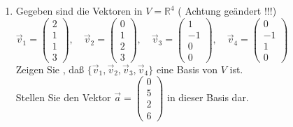 \documentclass[a4paper]{article}
\begin{document}
\begin{enumerate}
\begin{enumerate}
\end{enumerate}
\item Gegeben sind die Vektoren in $V = \mathbb R^4$ ( Achtung geändert !!!)\\
$\vec{v}_1 = \begin{pmatrix} 2 \\ 1 \\ 1 \\ 3 \end{pmatrix}, \quad
\vec{v}_2 = \begin{pmatrix} 0 \\ 1 \\ 2 \\ 3 \end{pmatrix}, \quad
\vec{v}_3 = \begin{pmatrix} 1 \\ -1 \\ 0 \\ 0 \end{pmatrix}, \quad
\vec{v}_4 = \begin{pmatrix} 0 \\ -1 \\ 1 \\ 0 \end{pmatrix} $ \\
Zeigen Sie , daß $\{ \vec{v}_1, \vec{v}_2, \vec{v}_3, \vec{v}_4 \}$ eine Basis von $V$ ist. \\
Stellen Sie den Vektor $\vec{a} = \begin{pmatrix} 0 \\ 5 \\ 2 \\ 6\end{pmatrix}$ in dieser Basis dar. 
\end{enumerate}
\end{document}
